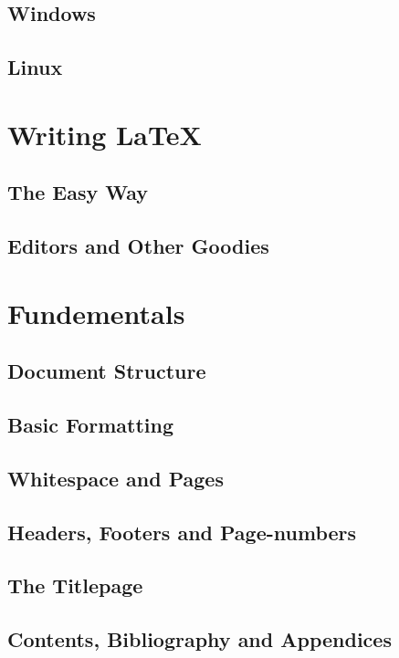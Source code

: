 \documentclass[12pt,a4paper]{article}
\begin{document}
\subsection{Windows}

\subsection{Linux}

\newpage
\section{Writing LaTeX}

\subsection{The Easy Way}

\subsection{Editors and Other Goodies}

\newpage
\section{Fundementals}

\subsection{Document Structure}

\subsection{Basic Formatting}

\subsection{Whitespace and Pages}

\subsection{Headers, Footers and Page-numbers}

\subsection{The Titlepage}

\subsection{Contents, Bibliography and Appendices}
\end{document}
